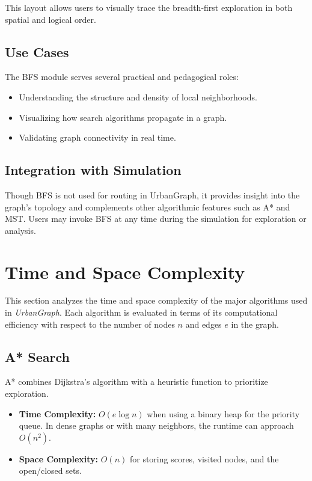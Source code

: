 \documentclass[12pt]{article}
\begin{document}
This layout allows users to visually trace the breadth-first exploration in both spatial and logical order.

\subsection*{Use Cases}

The BFS module serves several practical and pedagogical roles:
\begin{itemize}
    \item Understanding the structure and density of local neighborhoods.
    \item Visualizing how search algorithms propagate in a graph.
    \item Validating graph connectivity in real time.
\end{itemize}

\subsection*{Integration with Simulation}

Though BFS is not used for routing in UrbanGraph, it provides insight into the graph's topology and complements other algorithmic features such as A* and MST. Users may invoke BFS at any time during the simulation for exploration or analysis.


\section{Time and Space Complexity}

This section analyzes the time and space complexity of the major algorithms used in \textit{UrbanGraph}. Each algorithm is evaluated in terms of its computational efficiency with respect to the number of nodes \( n \) and edges \( e \) in the graph.

\subsection*{A* Search}

A* combines Dijkstra’s algorithm with a heuristic function to prioritize exploration.

\begin{itemize}
    \item \textbf{Time Complexity:} \( O(e \log n) \) when using a binary heap for the priority queue. In dense graphs or with many neighbors, the runtime can approach \( O(n^2) \).
    \item \textbf{Space Complexity:} \( O(n) \) for storing scores, visited nodes, and the open/closed sets.
\end{itemize}
\end{document}
